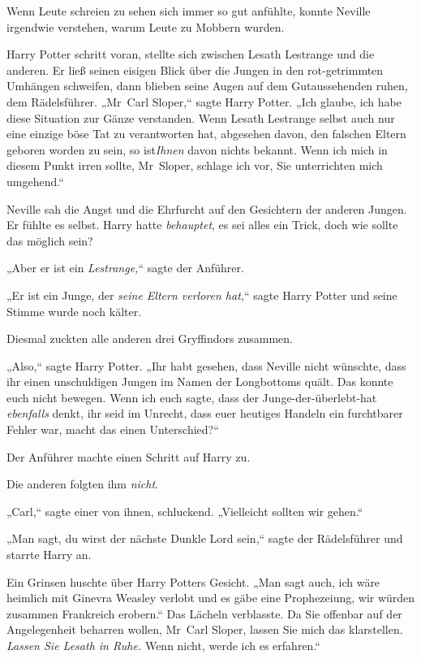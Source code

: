 {Wenn Leute schreien zu sehen sich immer so gut anfühlte, konnte Neville irgendwie verstehen, warum Leute zu Mobbern wurden.

Harry Potter schritt voran, stellte sich zwischen Lesath Lestrange und die anderen. Er ließ seinen eisigen Blick über die Jungen in den rot-getrimmten Umhängen schweifen, dann blieben seine Augen auf dem Gutaussehenden ruhen, dem Rädelsführer. „Mr~Carl Sloper,“ sagte Harry Potter. „Ich glaube, ich habe diese Situation zur Gänze verstanden. Wenn Lesath Lestrange selbst auch nur eine einzige böse Tat zu verantworten hat, abgesehen davon, den falschen Eltern geboren worden zu sein, so ist\emph{Ihnen} davon nichts bekannt. Wenn ich mich in diesem Punkt irren sollte, Mr~Sloper, schlage ich vor, Sie unterrichten mich umgehend.“

Neville sah die Angst und die Ehrfurcht auf den Gesichtern der anderen Jungen. Er fühlte es selbst. Harry hatte \emph{behauptet}, es sei alles ein Trick, doch wie sollte das möglich sein?

„Aber er ist ein \emph{Lestrange,}“ sagte der Anführer.

„Er ist ein Junge, der \emph{seine Eltern verloren hat,}“ sagte Harry Potter und seine Stimme wurde noch kälter.

Diesmal zuckten alle anderen drei Gryffindors zusammen.

„Also,“ sagte Harry Potter. „Ihr habt gesehen, dass Neville nicht wünschte, dass ihr einen unschuldigen Jungen im Namen der Longbottoms quält. Das konnte euch nicht bewegen. Wenn ich euch sagte, dass der Junge-der-überlebt-hat \emph{ebenfalls} denkt, ihr seid im Unrecht, dass euer heutiges Handeln ein furchtbarer Fehler war, macht das einen Unterschied?“

Der Anführer machte einen Schritt auf Harry zu.

Die anderen folgten ihm \emph{nicht}.

„Carl,“ sagte einer von ihnen, schluckend. „Vielleicht sollten wir gehen.“

„Man sagt, du wirst der nächste Dunkle Lord sein,“ sagte der Rädelsführer und starrte Harry an.

Ein Grinsen huschte über Harry Potters Gesicht. „Man sagt auch, ich wäre heimlich mit Ginevra Weasley verlobt und es gäbe eine Prophezeiung, wir würden zusammen Frankreich erobern.“ Das Lächeln verblasste. Da Sie offenbar auf der Angelegenheit beharren wollen, Mr~Carl Sloper, lassen Sie mich das klarstellen. \emph{Lassen Sie Lesath in Ruhe.} Wenn nicht, werde ich es erfahren.“

}
